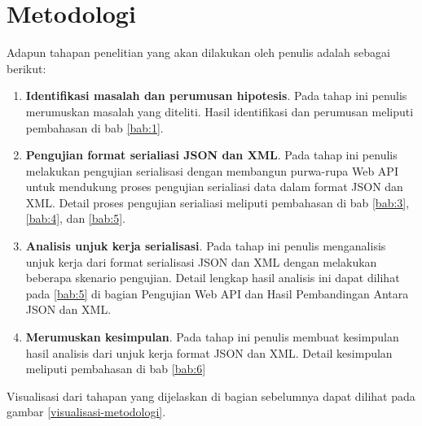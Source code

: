 \documentclass[a4paper, 12pt, oneside]{report}
\begin{document}
\section{Metodologi}
\onehalfspacing Adapun tahapan penelitian yang akan dilakukan oleh penulis adalah sebagai berikut:
\begin{enumerate}
  \item \textbf{Identifikasi masalah dan perumusan hipotesis}. Pada tahap ini penulis merumuskan masalah yang diteliti. Hasil identifikasi dan perumusan meliputi pembahasan di bab \ref{bab:1}.
  \item \textbf{Pengujian format serialiasi JSON dan XML}. Pada tahap ini penulis melakukan pengujian serialisasi dengan membangun purwa-rupa Web API untuk mendukung proses pengujian serialiasi data dalam format JSON dan XML. Detail proses pengujian serialiasi meliputi pembahasan di bab \ref{bab:3}, \ref{bab:4}, dan \ref{bab:5}.
  \item \textbf{Analisis unjuk kerja serialisasi}. Pada tahap ini penulis menganalisis unjuk kerja dari format serialisasi JSON dan XML dengan melakukan beberapa skenario pengujian. Detail lengkap hasil analisis ini dapat dilihat pada \ref{bab:5} di bagian Pengujian Web API dan Hasil Pembandingan Antara JSON dan XML.
  \item \textbf{Merumuskan kesimpulan}. Pada tahap ini penulis membuat kesimpulan hasil analisis dari unjuk kerja format JSON dan XML. Detail kesimpulan meliputi pembahasan di bab \ref{bab:6}
\end{enumerate}

Visualisasi dari tahapan yang dijelaskan di bagian sebelumnya dapat dilihat pada gambar \ref{visualisasi-metodologi}.
\end{document}
